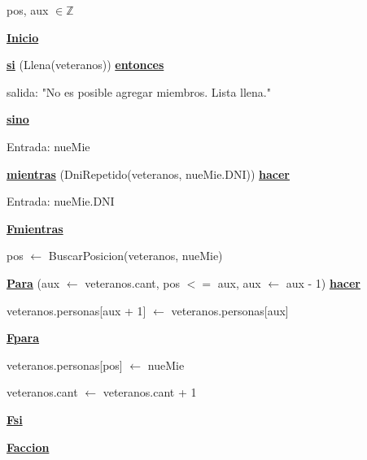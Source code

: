 \documentclass{article}
\begin{document}
            \hspace{12mm}pos, aux $\in \mathbb{Z}$

        \hspace{8mm}\underline{\textbf{Inicio}}

            \hspace{12mm}\underline{\textbf{si}} (Llena(veteranos)) \underline{\textbf{entonces}}

                \hspace{16mm}salida: "No es posible agregar miembros. Lista llena."

            \hspace{12mm}\underline{\textbf{sino}}

                \hspace{16mm}Entrada: nueMie

                \hspace{16mm}\underline{\textbf{mientras}} (DniRepetido(veteranos, nueMie.DNI)) \underline{\textbf{hacer}}

                    \hspace{20mm}Entrada: nueMie.DNI

                \hspace{16mm}\underline{\textbf{Fmientras}}

                \hspace{16mm} pos $\leftarrow$ BuscarPosicion(veteranos, nueMie)

                \hspace{16mm}\underline{\textbf{Para}} (aux $\leftarrow$ veteranos.cant, pos $<=$ aux, aux $\leftarrow$ aux - 1) 
                \underline{\textbf{hacer}}

                    \hspace{20mm}veteranos.personas[aux + 1] $\leftarrow$ veteranos.personas[aux]

                \hspace{16mm}\underline{\textbf{Fpara}}

                \hspace{16mm}veteranos.personas[pos] $\leftarrow$ nueMie

                \hspace{16mm}veteranos.cant $\leftarrow$ veteranos.cant + 1

            \hspace{12mm}\underline{\textbf{Fsi}}

    \hspace{4mm}\underline{\textbf{Faccion}}
\end{document}
